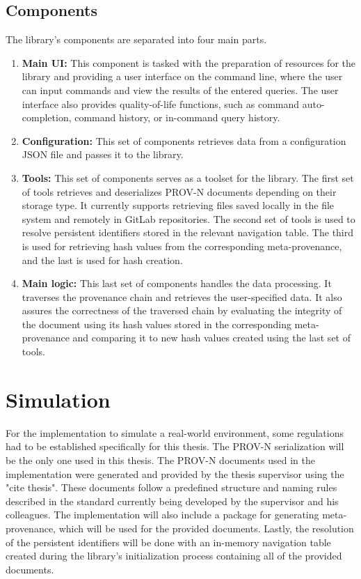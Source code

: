 \documentclass[
  digital,     %
  oneside,     %
  nosansbold,  %
  nocolorbold, %
  lof,         %
  lot,         %
]{fithesis4}
\begin{document}
\subsection{Components}
\shorthandoff{-}
The library's components are separated into four main parts.
\begin{enumerate}
    \item \textbf{Main UI:}
        This component is tasked with the preparation of resources for the library and providing a user interface on the command line, where the user can input commands and view the results of the entered queries. The user interface also provides quality-of-life functions, such as command auto-completion, command history, or in-command query history.
    \item \textbf{Configuration:}
        This set of components retrieves data from a configuration JSON file and passes it to the library.
    \item \textbf{Tools:}
        This set of components serves as a toolset for the library. The first set of tools retrieves and deserializes PROV-N documents depending on their storage type. It currently supports retrieving files saved locally in the file system and remotely in GitLab repositories. 
        The second set of tools is used to resolve persistent identifiers stored in the relevant navigation table.
        The third is used for retrieving hash values from the corresponding meta-provenance, and the last is used for hash creation.
    \item \textbf{Main logic:}
        This last set of components handles the data processing. It traverses the provenance chain and retrieves the user-specified data. It also assures the correctness of the traversed chain by evaluating the integrity of the document using its hash values stored in the corresponding meta-provenance and comparing it to new hash values created using the last set of tools.
\end{enumerate}
\shorthandon{-}

\section{Simulation}
\shorthandoff{-}
For the implementation to simulate a real-world environment, some regulations had to be established specifically for this thesis. The PROV-N serialization will be the only one used in this thesis. The PROV-N documents used in the implementation were generated and provided by the thesis supervisor using the "cite thesis". These documents follow a predefined structure and naming rules described in the standard currently being developed by the supervisor and his colleagues. The implementation will also include a package for generating meta-provenance, which will be used for the provided documents. Lastly, the resolution of the persistent identifiers will be done with an in-memory navigation table created during the library's initialization process containing all of the provided documents.
\shorthandon{-}
\end{document}
